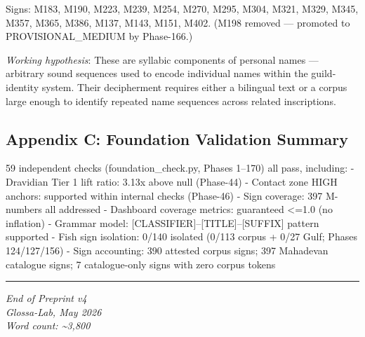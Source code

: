 \documentclass[
]{article}
\begin{document}
Signs: M183, M190, M223, M239, M254, M270, M295, M304, M321, M329,
M345, M357, M365, M386, M137, M143, M151, M402. (M198 removed --- promoted to PROVISIONAL\_MEDIUM by Phase-166.)

\emph{Working hypothesis}: These are syllabic components of personal
names --- arbitrary sound sequences used to encode individual names
within the guild-identity system. Their decipherment requires either a
bilingual text or a corpus large enough to identify repeated name
sequences across related inscriptions.

\subsection{Appendix C: Foundation Validation
Summary}\label{appendix-c-foundation-validation-summary}

59 independent checks (foundation\_check.py, Phases 1--170) all pass, including: -
Dravidian Tier 1 lift ratio: 3.13x above null (Phase-44) - Contact zone
HIGH anchors: supported within internal checks (Phase-46) - Sign coverage: 397 M-numbers all
addressed - Dashboard coverage metrics: guaranteed \textless{}=1.0 (no inflation) -
Grammar model: {[}CLASSIFIER{]}--{[}TITLE{]}--{[}SUFFIX{]} pattern
supported - Fish sign isolation: 0/140 isolated (0/113 corpus + 0/27 Gulf; Phases 124/127/156)
- Sign accounting: 390 attested corpus signs; 397 Mahadevan catalogue signs; 7 catalogue-only signs with zero corpus tokens

\begin{center}\rule{0.5\linewidth}{0.5pt}\end{center}

\emph{End of Preprint v4}\\
\emph{Glossa-Lab, May 2026}\\
\emph{Word count: \textasciitilde3,800}
\end{document}
